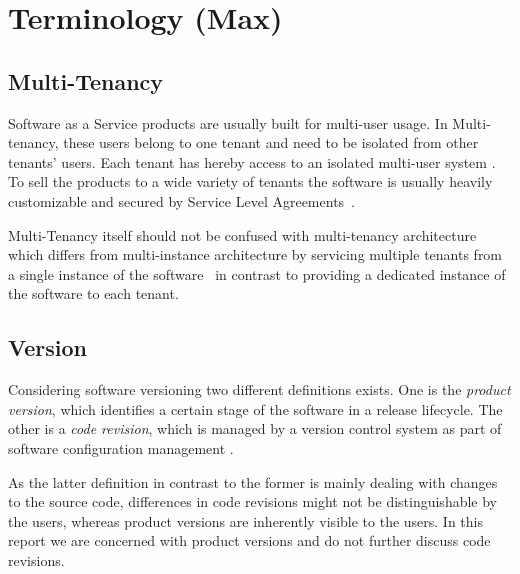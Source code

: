 \section{Terminology (Max)}
\label{sec:terminology}

\subsection{Multi-Tenancy}

Software as a Service products are usually built for multi-user usage. In Multi-tenancy, these users belong to one tenant and need to be isolated from other tenants' users. Each tenant has hereby access to an isolated multi-user system \cite{Chong2006a}. To sell the products to a wide variety of tenants the software is usually heavily customizable and secured by Service Level Agreements~\cite{Bezemer2010}.

Multi-Tenancy itself should not be confused with multi-tenancy architecture which differs from multi-instance architecture by servicing multiple tenants from a single instance of the software~\cite{Shao2011} in contrast to providing a dedicated instance of the software to each tenant.

\subsection{Version}

Considering software versioning two different definitions exists. One is the \emph{product version}, which identifies a certain stage of the software in a release lifecycle. The other is a \emph{code revision}, which is managed by a version control system as part of software configuration management \cite{swebook}.

As the latter definition in contrast to the former is mainly dealing with changes to the source code, differences in code revisions might not be distinguishable by the users, whereas product versions are inherently visible to the users. In this report we are concerned with product versions and do not further discuss code revisions.

